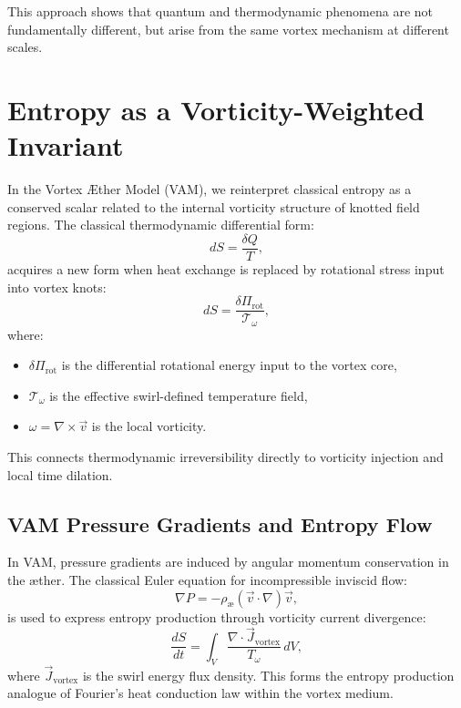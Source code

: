 This approach shows that quantum and thermodynamic phenomena are not fundamentally different, but arise from the same vortex mechanism at different scales.

\section*{Entropy as a Vorticity-Weighted Invariant}\label{sec:entropy_vorticity}

In the Vortex Æther Model (VAM), we reinterpret classical entropy as a conserved scalar related to the internal vorticity structure of knotted field regions. The classical thermodynamic differential form:
\begin{equation}
    dS = \frac{\delta Q}{T},
\end{equation}
acquires a new form when heat exchange is replaced by rotational stress input into vortex knots:
\begin{equation}
    dS = \frac{\delta \Pi_\text{rot}}{\mathcal{T}_\omega},
\end{equation}
where:
\begin{itemize}
    \item $\delta \Pi_\text{rot}$ is the differential rotational energy input to the vortex core,
    \item $\mathcal{T}_\omega$ is the effective swirl-defined temperature field,
    \item $\omega = \nabla \times \vec{v}$ is the local vorticity.
\end{itemize}
This connects thermodynamic irreversibility directly to vorticity injection and local time dilation.

\subsection*{VAM Pressure Gradients and Entropy Flow}

In VAM, pressure gradients are induced by angular momentum conservation in the æther. The classical Euler equation for incompressible inviscid flow:
\begin{equation}
    \nabla P = -\rho_\text{\ae} (\vec{v} \cdot \nabla) \vec{v},
\end{equation}
is used to express entropy production through vorticity current divergence:
\begin{equation}
    \frac{dS}{dt} = \int_V \frac{\nabla \cdot \vec{J}_\text{vortex}}{T_\omega} \, dV,
\end{equation}
where $\vec{J}_\text{vortex}$ is the swirl energy flux density. This forms the entropy production analogue of Fourier's heat conduction law within the vortex medium.

